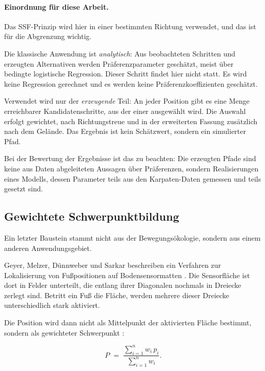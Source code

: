 \documentclass[12pt,a4paper]{report}
\begin{document}
\paragraph{Einordnung für diese Arbeit.}

Das SSF-Prinzip wird hier in einer bestimmten Richtung verwendet, und das ist für die
Abgrenzung wichtig.

Die klassische Anwendung ist \emph{analytisch}: Aus beobachteten Schritten und erzeugten
Alternativen werden Präferenzparameter geschätzt, meist über bedingte logistische
Regression. Dieser Schritt findet hier nicht statt. Es wird keine Regression gerechnet und
es werden keine Präferenzkoeffizienten geschätzt.

Verwendet wird nur der \emph{erzeugende} Teil: An jeder Position gibt es eine Menge
erreichbarer Kandidatenschritte, aus der einer ausgewählt wird. Die Auswahl erfolgt
gewichtet, nach Richtungstreue und in der erweiterten Fassung zusätzlich nach dem Gelände.
Das Ergebnis ist kein Schätzwert, sondern ein simulierter Pfad.

Bei der Bewertung der Ergebnisse ist das zu beachten: Die erzeugten Pfade sind keine aus
Daten abgeleiteten Aussagen über Präferenzen, sondern Realisierungen eines Modells, dessen
Parameter teils aus den Karpaten-Daten gemessen und teils gesetzt sind.

\subsection{Gewichtete Schwerpunktbildung}
\label{subsec:schwerpunkt}

Ein letzter Baustein stammt nicht aus der Bewegungsökologie, sondern aus einem anderen
Anwendungsgebiet.

Geyer, Melzer, Dünnweber und Sarkar beschreiben ein Verfahren zur Lokalisierung von
Fußpositionen auf Bodensensormatten \cite{GeyerMelzerDuennweber2026}. Die Sensorfläche ist
dort in Felder unterteilt, die entlang ihrer Diagonalen nochmals in Dreiecke zerlegt sind.
Betritt ein Fuß die Fläche, werden mehrere dieser Dreiecke unterschiedlich stark aktiviert.

Die Position wird dann nicht als Mittelpunkt der aktivierten Fläche bestimmt, sondern als
gewichteter Schwerpunkt \cite[Formel~(1)]{GeyerMelzerDuennweber2026}:

\begin{equation}
    P \;=\; \frac{\sum_{i=1}^{n} w_{i}\, p_{i}}{\sum_{i=1}^{n} w_{i}} .
    \label{eq:schwerpunkt}
\end{equation}
\end{document}
